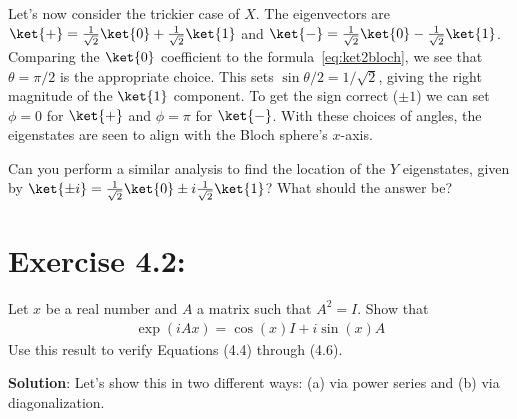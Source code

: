\documentclass{book}
\begin{document}
    Let's now consider the trickier case of $X$. The eigenvectors are $\ket{+} = \frac{1}{\sqrt{2}}\ket{0} + \frac{1}{\sqrt{2}}\ket{1}$ and $\ket{-} = \frac{1}{\sqrt{2}}\ket{0}-\frac{1}{\sqrt{2}}\ket{1}$. Comparing the $\ket{0}$ coefficient to the formula~\eqref{eq:ket2bloch}, we see that $\theta = \pi/2$ is the appropriate choice. This sets $\sin\theta/2 = 1/\sqrt{2}$, giving the right magnitude of the $\ket{1}$ component. To get the sign correct ($\pm 1$) we can set $\phi = 0$ for $\ket{+}$ and $\phi = \pi$ for $\ket{-}$. With these choices of angles, the eigenstates are seen to align with the Bloch sphere's $x$-axis.
    
    Can you perform a similar analysis to find the location of the $Y$ eigenstates, given by $\ket{\pm i } = \frac{1}{\sqrt{2}}\ket{0}\pm i \frac{1}{\sqrt{2}}\ket{1}$? What should the answer be?
    
\section*{Exercise 4.2:}
    Let $x$ be a real number and $A$ a matrix such that $A^2 = I$. Show that
    \begin{align}
        \exp(iAx) = \cos(x)I + i\sin(x)A
    \end{align}
    Use this result to verify Equations (4.4) through (4.6).
    
    \textbf{Solution}: Let's show this in two different ways: (a) via power series and (b) via diagonalization.
    
\end{document}
